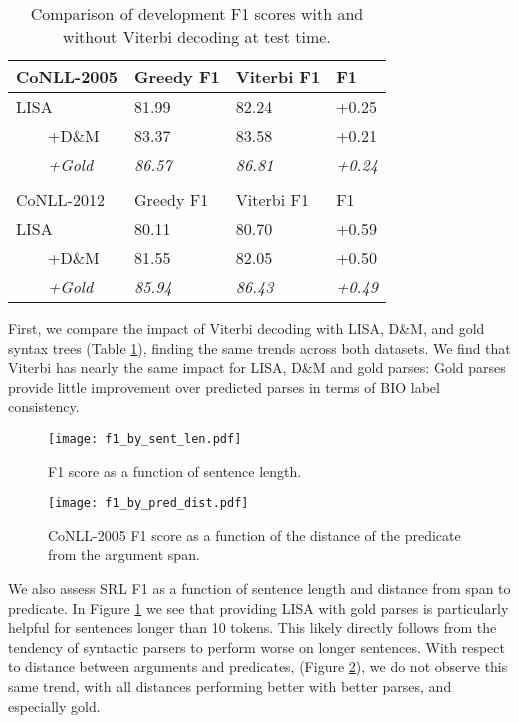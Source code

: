 \documentclass[11pt,a4paper]{article}
\begin{document}
\begin{table}
\begin{tabular}{llll}
CoNLL-2005 & Greedy F1 & Viterbi F1 &  F1 \\ \hline \hline
LISA & 81.99 & 82.24 & +0.25 \\
\ \ \ \ +D\&M & 83.37 & 83.58 & +0.21 \\
\ \ \ \ \emph{+Gold} & \emph{86.57} &	\emph{86.81} &	\emph{+0.24} \\
& & & \\
CoNLL-2012 & Greedy F1 & Viterbi F1 &  F1 \\ \hline \hline
LISA & 80.11	& 80.70	 & +0.59 \\
\ \ \ \ +D\&M & 81.55 &	82.05 & +0.50 \\
\ \ \ \ \emph{+Gold} & \emph{85.94} &	\emph{86.43} &	\emph{+0.49} \\
\end{tabular}

\caption{Comparison of development F1 scores with and without Viterbi decoding at test time. \label{viterbi-table}}
\end{table}

First, we compare the impact of Viterbi decoding with LISA, D\&M, and gold syntax trees (Table \ref{viterbi-table}), finding the same trends across both datasets. We find that Viterbi has nearly the same impact for LISA, D\&M and gold parses: Gold parses provide little improvement over predicted parses in terms of BIO label consistency. 

\begin{figure}
\texttt{[image: f1\_by\_sent\_len.pdf]}
\caption{F1 score as a function of sentence length.\label{fig:length}}
\end{figure}

\begin{figure}
\texttt{[image: f1\_by\_pred\_dist.pdf]}
\caption{CoNLL-2005 F1 score as a function of the distance of the predicate from the argument span.\label{fig:dist}}
\end{figure}

We also assess SRL F1 as a function of sentence length and distance from span to predicate. In Figure \ref{fig:length} we see that providing LISA with gold parses is particularly helpful for sentences longer than 10 tokens. This likely directly follows from the tendency of syntactic parsers to perform worse on longer sentences. With respect to distance between arguments and predicates, (Figure \ref{fig:dist}), we do not observe this same trend, with all distances performing better with better parses, and especially gold. 
\end{document}
